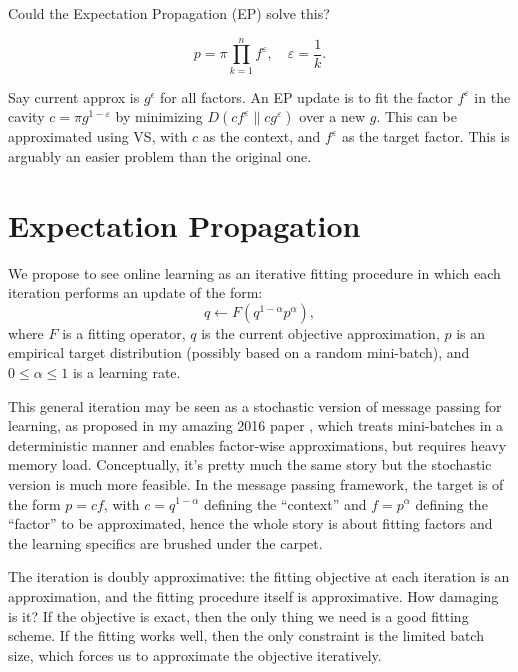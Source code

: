 \documentclass{article}
\begin{document}
Could the Expectation Propagation (EP) solve this?

$$
p = \pi \prod_{k=1}^n f^\varepsilon,
\quad
\varepsilon = \frac{1}{k}.
$$

Say current approx is $g^\epsilon$ for all factors. An EP update is to fit the factor $f^\varepsilon$ in the cavity $c=\pi g^{1-\varepsilon}$ by minimizing $D(cf^\varepsilon\|cg^\varepsilon)$ over a new $g$. This can be approximated using VS, with $c$ as the context, and $f^\varepsilon$ as the target factor. This is arguably an easier problem than the original one. 





\section{Expectation Propagation}

We propose to see online learning as an iterative fitting procedure in which each iteration performs an update of the form:
$$
q \leftarrow F(q^{1-\alpha} p^\alpha),
$$
where $F$ is a fitting operator, $q$ is the current objective approximation, $p$ is an empirical target distribution (possibly based on a random mini-batch), and $0\leq \alpha\leq 1$ is a learning rate. 


This general iteration may be seen as a stochastic version of message passing for learning, as proposed in my amazing 2016 paper \cite{rr:16}, which treats mini-batches in a deterministic manner and enables factor-wise approximations, but requires heavy memory load. Conceptually, it's pretty much the same story but the stochastic version is much more feasible. In the message passing framework, the target is of the form $p=cf$, with $c=q^{1-\alpha}$ defining the ``context'' and $f=p^\alpha$ defining the ``factor'' to be approximated, hence the whole story is about fitting factors and the learning specifics are brushed under the carpet. 

The iteration is doubly approximative: the fitting objective at each iteration is an approximation, and the fitting procedure itself is approximative. How damaging is it? If the objective is exact, then the only thing we need is a good fitting scheme. If the fitting works well, then the only constraint is the limited batch size, which forces us to approximate the objective iteratively.
\end{document}
